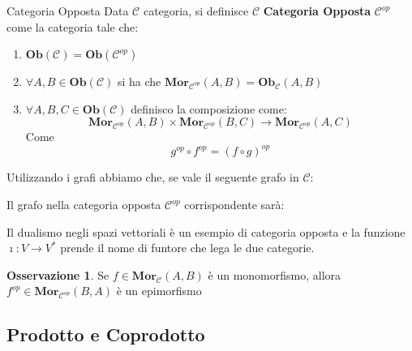 \documentclass[11pt,a4paper,twoside]{article}
\theoremstyle{definition}
\newtheorem*{oss}{Osservazione}
\begin{document}
\begin{defn}{Categoria Opposta}{}
	Data $\mathcal C$ categoria, si definisce $\mathcal C$ \textbf{Categoria Opposta} $\mathcal C^{op}$ come la categoria tale che:
	\begin{enumerate}
		\item $\bm{Ob}(\mathcal C) = \bm{Ob}(\mathcal C^{op})$
		\item $\forall A, B \in \bm{Ob}(\mathcal C)$ si ha che $\bm{Mor}_{\mathcal C^{op}}(A, B) = \bm{Ob}_\mathcal C(A, B)$
		\item $\forall A, B, C \in \bm{Ob}(\mathcal C)$ definisco la composizione come:
			\[ \bm{Mor}_{\mathcal C^{op}}(A,B) \times \bm{Mor}_{\mathcal C^{op}}(B, C) \to \bm{Mor}_{\mathcal C^{op}}(A, C) \]
			Come \[ g^{op} \circ f^{op} = (f \circ g)^{op}\]
	\end{enumerate}
\end{defn}

Utilizzando i grafi abbiamo che, se vale il seguente grafo in $\mathcal C$:
\begin{center}
\end{center}
Il grafo nella categoria opposta $\mathcal C^{op}$ corrispondente sarà:
\begin{center}
\end{center}

Il dualismo negli spazi vettoriali è un esempio di categoria opposta e la funzione $\imath: V \to V^*$ prende il nome di funtore che lega le due categorie.

\begin{oss}
	Se $f \in \bm{Mor}_{\mathcal C}(A,B)$ è un monomorfismo, allora $f^{op} \in \bm{Mor}_{\mathcal C^{op}}(B, A)$ è un epimorfismo
\end{oss}

\subsection{Prodotto e Coprodotto}
\end{document}
